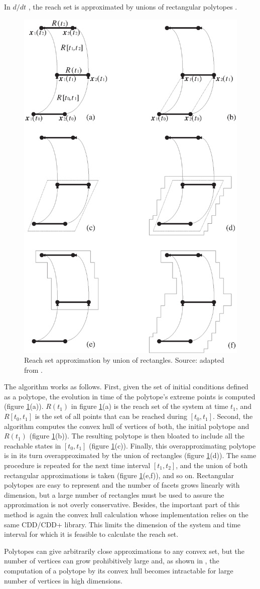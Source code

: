 \documentclass{report}
\begin{document}
In $d/dt$ \cite{ddt},
the reach set is approximated by unions of rectangular polytopes \cite{maler}.
\begin{figure}[htbp]
\centerline{
\includegraphics[width=6.5 cm, height=8 cm]{ddt.eps}}
\caption{Reach set approximation by union of rectangles.
Source: adapted from \cite{maler}.}
\label{ddtfig}
\end{figure}
The algorithm works as follows. First, given the set of initial conditions
defined as a polytope, the evolution in time of the polytope's extreme points
is computed (figure \ref{ddtfig}(a)).
$R(t_1)$ in figure \ref{ddtfig}(a) is the
reach set of the system at time $t_1$, and $R[t_0, t_1]$ is the set of all
points that can be reached during $[t_0, t_1]$. Second, the
algorithm computes the convex hull of vertices of both, the initial polytope
and $R(t_1)$ (figure \ref{ddtfig}(b)).
The resulting polytope is then bloated to include
all the reachable states in $[t_0,t_1]$
(figure \ref{ddtfig}(c)). Finally, this overapproximating polytope is in its
turn overapproximated by the union of rectangles (figure \ref{ddtfig}(d)).
The same procedure is repeated for the next time interval $[t_1,t_2]$, and
the union of both rectangular approximations is taken
(figure \ref{ddtfig}(e,f)), and so on.
Rectangular polytopes are easy to represent and the number
of facets grows linearly with dimension, but a large number of rectangles
must be used to assure the approximation is not overly conservative.
Besides, the important part of this method is again the convex hull
calculation whose implementation relies on the same CDD/CDD+
library. This limits the dimension of the system and time interval
for which it is feasible to calculate the reach set.

Polytopes can give arbitrarily close approximations to any convex set,
but the number of vertices can grow prohibitively large and,
as shown in \cite{avis}, the computation of a polytope by its convex hull
becomes intractable for large number of vertices in high dimensions.
\end{document}
